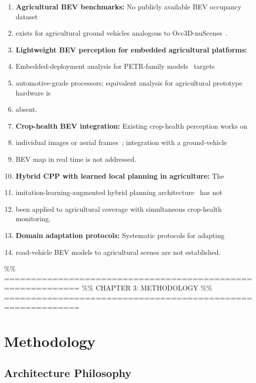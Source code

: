 \documentclass[12pt, a4paper]{article}
\begin{document}
\begin{enumerate}
  \item \textbf{Agricultural BEV benchmarks:} No publicly available BEV occupancy dataset
  \item exists for agricultural ground vehicles analogous to Occ3D-nuScenes~\cite{ref40}.
  \item \textbf{Lightweight BEV perception for embedded agricultural platforms:}
  \item Embedded-deployment analysis for PETR-family models~\cite{ref68, ref71} targets
  \item automotive-grade processors; equivalent analysis for agricultural prototype hardware is
  \item absent.
  \item \textbf{Crop-health BEV integration:} Existing crop-health perception works on
  \item individual images or aerial frames~\cite{ref191, ref194}; integration with a ground-vehicle
  \item BEV map in real time is not addressed.
  \item \textbf{Hybrid CPP with learned local planning in agriculture:} The
  \item imitation-learning-augmented hybrid planning architecture~\cite{ref102, ref129} has not
  \item been applied to agricultural coverage with simultaneous crop-health monitoring.
  \item \textbf{Domain adaptation protocols:} Systematic protocols for adapting
  \item road-vehicle BEV models to agricultural scenes are not established.
\end{enumerate}

\%\% ============================================================
\%\% CHAPTER 3: METHODOLOGY
\%\% ============================================================
\chapter{Methodology}
\label{ch:methodology}

\section{Architecture Philosophy}
\end{document}
